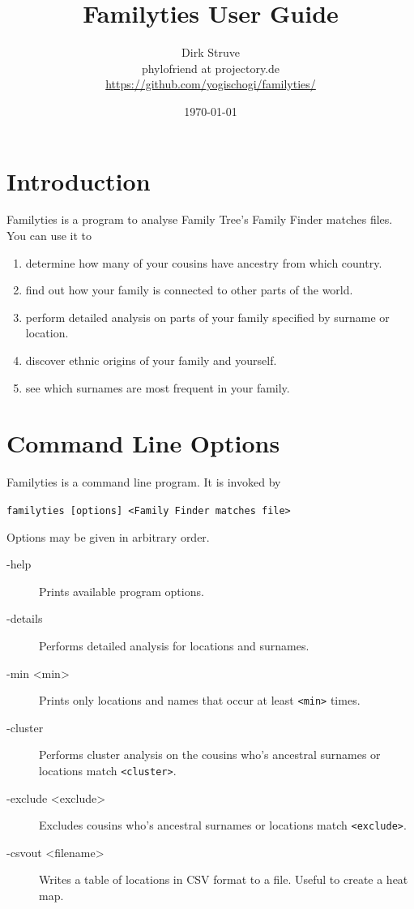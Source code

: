 \documentclass[12pt,a4paper]{article}
\begin{document}
\title{Familyties User Guide}
\author{Dirk Struve\\
phylofriend at projectory.de\\
\href{https://github.com/yogischogi/familyties/}{https://github.com/yogischogi/familyties/}}
\date{\today}
\maketitle
\tableofcontents

\section{Introduction}
Familyties is a program to analyse Family Tree's Family Finder
matches files. You can use it to
\begin{enumerate}
\item determine how many of your cousins have ancestry from which
  country.
\item find out how your family is connected to other parts of the
  world.
\item perform detailed analysis on parts of your family specified
  by surname or location.
\item discover ethnic origins of your family and yourself.
\item see which surnames are most frequent in your family.
\end{enumerate}


\section{Command Line Options}

Familyties is a command line program. It is invoked by

\vspace{1em}
\noindent\texttt{familyties [options] <Family Finder matches file>}

\vspace{1em}
\noindent Options may be given in arbitrary order.

\begin{description}
\item[-help] Prints available program options.
\item[-details] Performs detailed analysis for locations
  and surnames.
\item[-min <min>] Prints only locations and names that occur at
  least \texttt{<min>} times.
\item[-cluster] Performs cluster analysis on the cousins
  who's ancestral surnames or locations match \texttt{<cluster>}.
\item[-exclude <exclude>] Excludes cousins who's ancestral surnames or
  locations match \texttt{<exclude>}.
\item[-csvout <filename>] Writes a table of locations in CSV format
  to a file. Useful to create a heat map.
\end{description}
\end{document}
